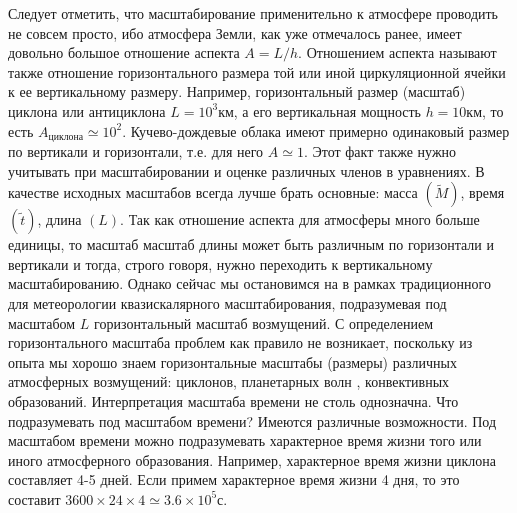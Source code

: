 Следует отметить, что масштабирование применительно к атмосфере проводить не совсем просто, ибо атмосфера Земли, как уже отмечалось ранее, имеет довольно большое отношение аспекта $A=L/h$. Отношением аспекта называют также отношение горизонтального размера той или иной циркуляционной ячейки к ее вертикальному размеру. Например, горизонтальный размер (масштаб) циклона или антициклона $L=10^3$км, а его вертикальная мощность $h = 10$км, то есть $A_{циклона}  \simeq 10^2$. Кучево-дождевые облака имеют примерно одинаковый размер по вертикали и горизонтали, т.е. для него $A \simeq 1$. Этот факт также нужно учитывать при масштабировании и оценке различных членов в уравнениях. В качестве исходных масштабов всегда лучше брать основные: масса $(\tilde{M})$, время $(\tilde{t})$, длина $(L)$. Так как отношение аспекта для атмосферы много больше единицы, то масштаб масштаб длины может быть различным по горизонтали и вертикали и тогда, строго говоря, нужно переходить к вертикальному масштабированию. Однако сейчас мы остановимся на в рамках традиционного для метеорологии квазискалярного масштабирования, подразумевая под масштабом $L$ горизонтальный масштаб возмущений. С определением горизонтального масштаба проблем как правило не возникает, поскольку из опыта мы хорошо знаем горизонтальные масштабы (размеры) различных атмосферных возмущений: циклонов, планетарных волн , конвективных образований. Интерпретация масштаба времени не столь однозначна. Что подразумевать под масштабом времени? Имеются различные возможности. Под масштабом времени можно  подразумевать характерное время жизни того или иного атмосферного образования. Например, характерное время жизни циклона составляет 4-5 дней. Если примем характерное время жизни 4 дня, то это составит $3600\times24\times4\simeq3.6\times10^5$с. 

